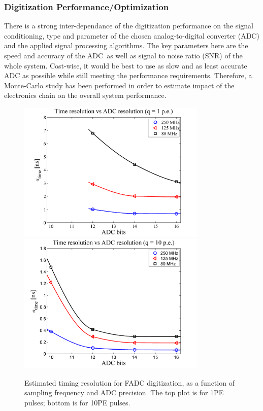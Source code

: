 \subsubsection{Digitization Performance/Optimization}\label{fadc_performance}

There is a strong inter-dependance of the digitization performance on the signal conditioning, type and
parameter of the chosen analog-to-digital converter (ADC) and the applied signal processing algorithms. The key parameters here are the speed and accuracy of the ADC\ as well as signal to noise ratio (SNR) of the whole system. Cost-wise, it would be best to use as slow and as least accurate ADC as possible while still meeting the performance requirements. Therefore, a Monte-Carlo study has been performed in order to estimate impact of the electronics chain on the overall system performance.  

\begin{figure}[htpb]
\centering
  \includegraphics[width=9cm]{figures/time_vs_bits-dyn_2000pe-pls_1pe.png}
  \includegraphics[width=9cm]{figures/time_vs_bits-dyn_2000pe-pls_10pe.png}
  \caption{Estimated timing resolution for FADC digitization, as a function of sampling frequency and ADC precision.  The top plot is for 1PE pulses; bottom is for 10PE pulses.}
\label{fig:timing_vs_dyn}
\end{figure}

